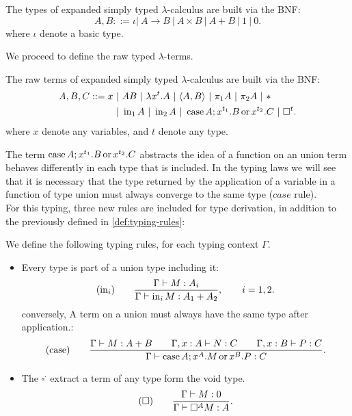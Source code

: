 \begin{definition}
  The types of expanded simply typed $\lambda$-calculus are built via the BNF:
  $$A,B ::= \iota |\ A\to B\ |\ A \times B \ |\ A + B  \ |\ 1\ |\ 0.$$
  where $\iota$ denote a basic type. 
\end{definition}

We proceed to define the raw typed $\lambda$-terms.

\begin{definition}
  The raw terms of expanded simply typed $\lambda$-calculus are built via the BNF:
  \begin{align*}
    A,B, C ::= x\ &|\ AB\ |\ \lambda x^t.A \ |\ \langle A,B \rangle\ |\ \pi_1A\ |\ \pi_2A\ |\ * \\
                  &|\ \iin_1 A\ |\ \iin_2 A \ |\ \ccase A ; x^{t_1}.B\oo x^{t_2}.C \ |\ \square^t. 
  \end{align*}
  where $x$ denote any variables, and $t$ denote any type. 
\end{definition}

The term $\operatorname{case} A ; x^{t_1}.B\operatorname{ or } x^{t_2}.C$ abstracts the idea of a function on  an union term behaves differently in each type that is included. In the typing laws we will see that it is necessary that the type returned by the application of a variable in a function of type union must always converge to the same type ($case$ rule).\\

For this typing, three new rules are included for type derivation, in addition to the previously defined in \ref{def:typing-rules}:
\begin{definition}
  We define the following typing rules, for each typing context $\Gamma$.
  \begin{itemize}
  \item Every type is part of a union type including it:
    $$  (\operatorname{in}_i)\qquad  {\displaystyle\Gamma \vdash M:A_i \over \Gamma \vdash \operatorname{in}_i M:A_1+A_2},\qquad  i=  1,2.$$
    conversely, A term on a union must always have the same type after application.:
    $$(\operatorname{case}) \qquad {\displaystyle \Gamma\vdash M: A+B\qquad \Gamma, x:A\vdash N: C\qquad \Gamma, x:B\vdash P: C \over \Gamma \vdash \operatorname{case}A ; x^{A}.M\operatorname{ or }x^{B}.P:C}.$$
  \item The $\square^\cdot$ extract a term of any type form the void type.
    $$  (\square)\qquad  {\displaystyle\Gamma \vdash M:0 \over \Gamma \vdash \square^A M:A}.$$
  \end{itemize}
\end{definition}


